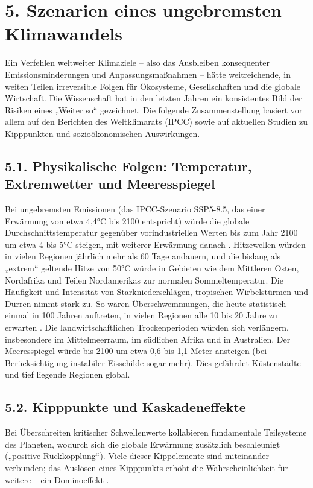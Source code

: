 \documentclass[12pt, a4paper]{article}
\begin{document}
	\section*{5. Szenarien eines ungebremsten Klimawandels}
	
	Ein Verfehlen weltweiter Klimaziele – also das Ausbleiben konsequenter Emissionsminderungen und Anpassungsmaßnahmen – hätte weitreichende, in weiten Teilen irreversible Folgen für Ökosysteme, Gesellschaften und die globale Wirtschaft.
	Die Wissenschaft hat in den letzten Jahren ein konsistentes Bild der Risiken eines „Weiter so“ gezeichnet.
	Die folgende Zusammenstellung basiert vor allem auf den Berichten des Weltklimarats (IPCC) sowie auf aktuellen Studien zu Kipppunkten und sozioökonomischen Auswirkungen.
	
	\subsection*{5.1. Physikalische Folgen: Temperatur, Extremwetter und Meeresspiegel}
	Bei ungebremsten Emissionen (das IPCC-Szenario SSP5-8.5, das einer Erwärmung von etwa 4,4°C bis 2100 entspricht) würde die globale Durchschnittstemperatur gegenüber vorindustriellen Werten bis zum Jahr 2100 um etwa 4 bis 5°C steigen, mit weiterer Erwärmung danach \cite{ipcc2021}.
	Hitzewellen würden in vielen Regionen jährlich mehr als 60 Tage andauern, und die bislang als „extrem“ geltende Hitze von 50°C würde in Gebieten wie dem Mittleren Osten, Nordafrika und Teilen Nordamerikas zur normalen Sommeltemperatur.
	Die Häufigkeit und Intensität von Starkniederschlägen, tropischen Wirbelstürmen und Dürren nimmt stark zu.
	So wären Überschwemmungen, die heute statistisch einmal in 100 Jahren auftreten, in vielen Regionen alle 10 bis 20 Jahre zu erwarten \cite{ipcc2021}.
	Die landwirtschaftlichen Trockenperioden würden sich verlängern, insbesondere im Mittelmeerraum, im südlichen Afrika und in Australien.
	Der Meeresspiegel würde bis 2100 um etwa 0,6 bis 1,1 Meter ansteigen (bei Berücksichtigung instabiler Eisschilde sogar mehr).
	Dies gefährdet Küstenstädte und tief liegende Regionen global.
	
	\subsection*{5.2. Kipppunkte und Kaskadeneffekte}
	Bei Überschreiten kritischer Schwellenwerte kollabieren fundamentale Teilsysteme des Planeten, wodurch sich die globale Erwärmung zusätzlich beschleunigt („positive Rückkopplung“). Viele dieser Kippelemente sind miteinander verbunden;
	das Auslösen eines Kipppunkts erhöht die Wahrscheinlichkeit für weitere – ein Dominoeffekt \cite{carbonbrief2025}.
	
\end{document}
